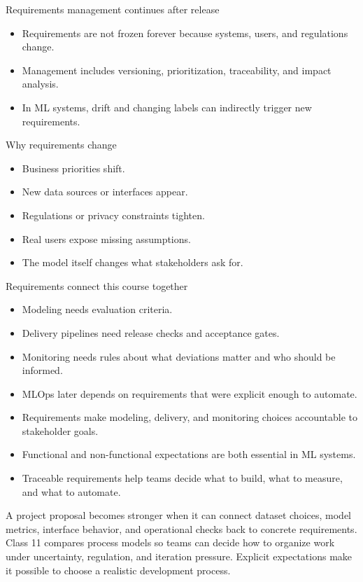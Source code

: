 \begin{frame}{Requirements management continues after release}
\begin{itemize}
\item Requirements are not frozen forever because systems, users, and regulations change.
\item Management includes versioning, prioritization, traceability, and impact analysis.
\item In ML systems, drift and changing labels can indirectly trigger new requirements.
\end{itemize}
\coursefooter
\end{frame}

\begin{frame}{Why requirements change}
\begin{itemize}
\item Business priorities shift.
\item New data sources or interfaces appear.
\item Regulations or privacy constraints tighten.
\item Real users expose missing assumptions.
\item The model itself changes what stakeholders ask for.
\end{itemize}
\coursefooter
\end{frame}

\begin{frame}{Requirements connect this course together}
\begin{itemize}
\item Modeling needs evaluation criteria.
\item Delivery pipelines need release checks and acceptance gates.
\item Monitoring needs rules about what deviations matter and who should be informed.
\item MLOps later depends on requirements that were explicit enough to automate.
\end{itemize}
\coursefooter
\end{frame}

\classclosingframe
{\begin{itemize}
\item Requirements make modeling, delivery, and monitoring choices accountable to stakeholder goals.
\item Functional and non-functional expectations are both essential in ML systems.
\item Traceable requirements help teams decide what to build, what to measure, and what to automate.
\end{itemize}}
{A project proposal becomes stronger when it can connect dataset choices, model metrics, interface behavior, and operational checks back to concrete requirements.}
{Class 11 compares process models so teams can decide how to organize work under uncertainty, regulation, and iteration pressure.}
{Explicit expectations make it possible to choose a realistic development process.}


